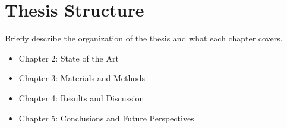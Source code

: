 \section{Thesis Structure}

Briefly describe the organization of the thesis and what each chapter
covers.

\begin{itemize}
  \item Chapter 2: State of the Art
  \item Chapter 3: Materials and Methods
  \item Chapter 4: Results and Discussion
  \item Chapter 5: Conclusions and Future Perspectives
\end{itemize}
